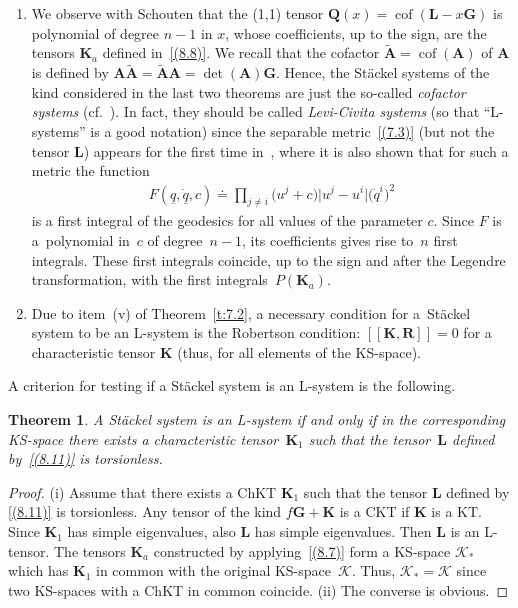 \documentclass[10pt,a4paper]{amsart}
\def\bs{\boldsymbol}
\numberwithin{equation}{section}
\newtheorem{Theorem}{Theorem}[section]
 { \theoremstyle{definition}
\newtheorem{Notation}[Theorem]{Notation}
\newtheorem{Example}[Theorem]{Example}
\newtheorem{Remark}[Theorem]{Remark}
\newtheorem{Remarks}[Theorem]{Remarks}
 }
\providecommand{\cal}{\mathcal}
\begin{document}
\begin{Remarks}
\begin{enumerate}
\item[(iii)] We observe with Schouten \cite{Schouten-1954} that the (1,1) tensor $\bs Q(x)=\operatorname{cof}(\bs L-x\bs G)$ is polynomial of degree $n-1$ in $x$, whose coef\/f\/icients, up to the sign, are the tensors $\bs K_a$ def\/ined in~\eqref{(8.8)}. We recall that the cofactor $\tilde{\bs A}=\operatorname{cof}(\bs A)$ of $\bs A$ is def\/ined by $\bs A\tilde{\bs A}=\tilde{\bs A}\bs A=\det(\bs A)\bs G$. Hence, the St\"ackel systems of the kind considered in the last two theorems are just the so-called {\it cofactor systems} (cf.~\cite{Blaszak-Ma-2003}).
In fact, they should be called {\it Levi-Civita systems} (so that ``L-systems'' is a good notation) since the separable metric~\eqref{(7.3)} (but not the tensor $\bs L$) appears for the f\/irst time in~\cite{LC-1896}, where it is also shown that for such a metric the function
\begin{gather*}
F(\underline q,\underline{\dot q},c)\doteq  \prod_{j\neq i} \big(u^j+c\big) \big|u^j-u^i\big| \big(\dot q^i\big)^2
\end{gather*}
is a f\/irst integral of the geodesics for all values of the parameter $c$. Since $F$ is a~polynomial in~$c$ of degree~$n-1$, its coef\/f\/icients gives rise to~$n$ f\/irst integrals. These f\/irst integrals coincide, up to the sign and after the Legendre transformation, with the f\/irst integ\-rals~$P(\bs K_a)$.

\item[(iv)] Due to item~(v) of Theorem~\ref{t:7.2}, a necessary condition for a~St\"ackel system to be an L-system is the Robertson condition: $[\! [\bs K,\bs R]\! ]=0$ for a characteristic tensor $\bs K$ (thus, for all elements of the KS-space).
 \end{enumerate}
 \end{Remarks}

     A criterion for testing if a St\"ackel system is an L-system is the following.

\begin{Theorem}
A St\"ackel system is an L-system if and only if in the corresponding KS-space there exists a characteristic tensor~$\bs K_1$ such that the tensor~$\bs L$ defined by~\eqref{(8.11)} is torsionless.
\end{Theorem}

\begin{proof}
(i) Assume that there exists a ChKT $\bs K_1$ such that the tensor $\bs L$ def\/ined by \eqref{(8.11)} is torsionless. Any tensor of the kind $f\bs G+\bs K$ is a CKT if $\bs K$ is a KT. Since $\bs K_1$ has simple eigenvalues, also $\bs L$ has simple eigenvalues. Then $\bs L$ is an L-tensor. The tensors $\bs K_a$ constructed by applying~\eqref{(8.7)} form a KS-space $\cal K_*$ which has $\bs K_1$ in common with the original KS-space~$\cal K$.  Thus, $\cal K_*=\cal K$ since two KS-spaces with a ChKT in common coincide. (ii) The converse is obvious.
\end{proof}
\end{document}
